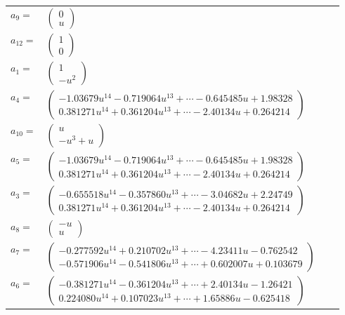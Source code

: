 \documentclass[1p]{elsarticle_modified}
\theoremstyle{definition}
\begin{document}
\begin{tabular}{m{7pt} m{180pt} m{7pt} m{180pt} }
\flushright $a_{9}=$&$\begin{pmatrix}0\\u\end{pmatrix}$ \\
\flushright $a_{12}=$&$\begin{pmatrix}1\\0\end{pmatrix}$ \\
\flushright $a_{1}=$&$\begin{pmatrix}1\\- u^2\end{pmatrix}$ \\
\flushright $a_{4}=$&$\begin{pmatrix}-1.03679 u^{14}-0.719064 u^{13}+\cdots-0.645485 u+1.98328\\0.381271 u^{14}+0.361204 u^{13}+\cdots-2.40134 u+0.264214\end{pmatrix}$ \\
\flushright $a_{10}=$&$\begin{pmatrix}u\\- u^3+u\end{pmatrix}$ \\
\flushright $a_{5}=$&$\begin{pmatrix}-1.03679 u^{14}-0.719064 u^{13}+\cdots-0.645485 u+1.98328\\0.381271 u^{14}+0.361204 u^{13}+\cdots-2.40134 u+0.264214\end{pmatrix}$ \\
\flushright $a_{3}=$&$\begin{pmatrix}-0.655518 u^{14}-0.357860 u^{13}+\cdots-3.04682 u+2.24749\\0.381271 u^{14}+0.361204 u^{13}+\cdots-2.40134 u+0.264214\end{pmatrix}$ \\
\flushright $a_{8}=$&$\begin{pmatrix}- u\\u\end{pmatrix}$ \\
\flushright $a_{7}=$&$\begin{pmatrix}-0.277592 u^{14}+0.210702 u^{13}+\cdots-4.23411 u-0.762542\\-0.571906 u^{14}-0.541806 u^{13}+\cdots+0.602007 u+0.103679\end{pmatrix}$ \\
\flushright $a_{6}=$&$\begin{pmatrix}-0.381271 u^{14}-0.361204 u^{13}+\cdots+2.40134 u-1.26421\\0.224080 u^{14}+0.107023 u^{13}+\cdots+1.65886 u-0.625418\end{pmatrix}$ \\

\end{tabular}
\end{document}

